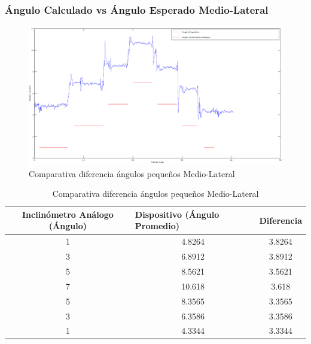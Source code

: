 \documentclass[12pt,a4paper]{article}
\begin{document}
\subsubsection{Ángulo Calculado vs Ángulo Esperado Medio-Lateral}
\begin{figure}[H]
	\centering
	\includegraphics[scale=0.4]{images/pruebas/Inclinometro/medioLateralB}
	\caption{Comparativa diferencia ángulos pequeños Medio-Lateral}
	\label{fig:inclinometroVsDispositivoML}
\end{figure}

\begin{table}[H]
	\centering
		\begin{tabular}{|c|c|c|}
			\hline
			\textbf{Inclinómetro Análogo (Ángulo)} & \multicolumn{1}{l|}{\textbf{Dispositivo (Ángulo Promedio)}} & Diferencia				 \\ \hline
			1                                      & 4.8264                                                      & 3.8264                     \\ \hline
			3                                      & 6.8912                                                      & 3.8912                     \\ \hline
			5                                      & 8.5621                                                      & 3.5621                     \\ \hline
			7                                      & 10.618                                                      & 3.618                      \\ \hline
			5                                      & 8.3565                                                      & 3.3565                     \\ \hline
			3                                      & 6.3586                                                      & 3.3586                     \\ \hline
			1                                      & 4.3344                                                      & 3.3344                     \\ \hline
		\end{tabular}
		\caption{Comparativa diferencia ángulos pequeños Medio-Lateral}
		\label{table:inclinometroVsDispositivoML}
\end{table}
\end{document}
